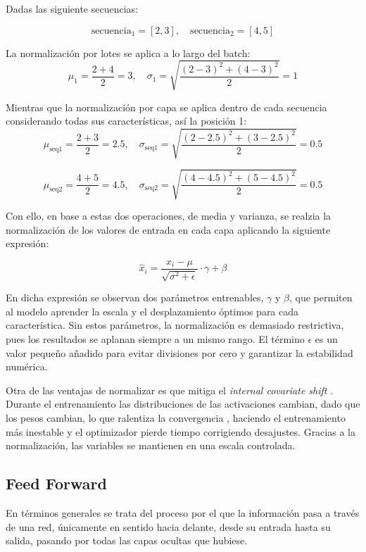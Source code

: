 \documentclass[11pt]{book}
\theoremstyle{plain}
\theoremstyle{definition}
\begin{document}
Dadas las siguiente secuencias: 

\[
\text{secuencia}_1 = [2,3], \quad \text{secuencia}_2 = [4,5]
\]

La normalización por lotes se aplica a lo largo del batch:
\[
\mu_1 = \frac{2 + 4}{2} = 3, 
\quad 
\sigma_1 = \sqrt{\frac{(2-3)^2 + (4-3)^2}{2}} = 1
\]

Mientras que la normalización por capa se aplica dentro de cada secuencia considerando todas sus características, así la posición 1:
\[
\mu_{\text{seq1}} = \frac{2 + 3}{2} = 2.5, 
\quad 
\sigma_{\text{seq1}} = \sqrt{\frac{(2-2.5)^2 + (3-2.5)^2}{2}} = 0.5
\]

\[
\mu_{\text{seq2}} = \frac{4 + 5}{2} = 4.5, 
\quad 
\sigma_{\text{seq2}} = \sqrt{\frac{(4-4.5)^2 + (5-4.5)^2}{2}} = 0.5
\]


Con ello, en base a estas dos operaciones, de media y varianza, se realzia la normalización de los valores de entrada en cada capa aplicando la siguiente expresión: 

\begin{equation}
    \hat{x}_i = \frac{x_i - \mu}{\sqrt{\sigma^2 + \epsilon}} \cdot \gamma + \beta
    \label{eq:normalization_sigma}
\end{equation}


En dicha expresión se observan dos parámetros entrenables, $\gamma$ y $\beta$, que permiten al modelo aprender la escala y el desplazamiento óptimos para cada característica. Sin estos parámetros, la normalización es demasiado restrictiva, pues los resultados se aplanan siempre a un mismo rango. El término $\epsilon$ es un valor pequeño añadido para evitar divisiones por cero y garantizar la estabilidad numérica.

Otra de las ventajas de normalizar es que mitiga el \textit{internal covariate shift} \parencite{sharma2024addnorm}. Durante el entrenamiento las distribuciones de las activaciones cambian, dado que los pesos cambian, lo que ralentiza la convergencia \parencite{apxml_addnorm}, haciendo el entrenamiento más inestable y el optimizador pierde tiempo corrigiendo desajustes. Gracias a la normalización, las variables se mantienen en una escala controlada.


\subsection{Feed Forward} \label{subsec:feedforward}
En términos generales se trata del proceso por el que la información pasa a través de una red, únicamente en sentido hacia delante, desde su entrada hasta su salida, pasando por todas las capas ocultas que hubiese. 
\end{document}
